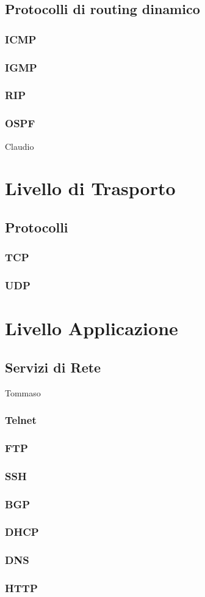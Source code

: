 \documentclass[a4paper,11pt]{paper}
\begin{document}
\subsection{Protocolli di routing dinamico}
\subsubsection{ICMP}
\subsubsection{IGMP}
\subsubsection{RIP}
\subsubsection{OSPF}


Claudio
\newpage
\section{Livello di Trasporto}
\subsection{Protocolli}
\subsubsection{TCP}
\subsubsection{UDP}
\newpage

\section{Livello Applicazione}
\subsection{Servizi di Rete}
Tommaso
\subsubsection{Telnet}
\subsubsection{FTP}
\subsubsection{SSH}
\subsubsection{BGP}
\subsubsection{DHCP}
\subsubsection{DNS}
\subsubsection{HTTP}
\end{document}
